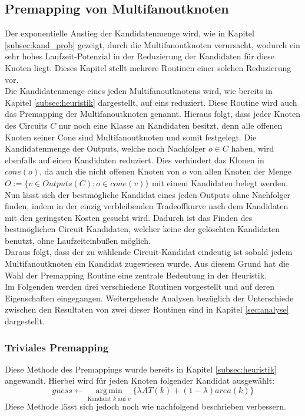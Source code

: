 \documentclass[11pt, a4paper, german]{article}
\DeclareMathOperator*{\argmin}{arg\,min}
\begin{document}
 \subsection{Premapping von Multifanoutknoten}
 \label{sec:premapping}
Der exponentielle Anstieg der Kandidatenmenge wird, wie in Kapitel \ref{subsec:kand_prob} gezeigt, durch die Multifanoutknoten verursacht, wodurch  ein sehr hohes Laufzeit-Potenzial in der Reduzierung der Kandidaten für diese Knoten liegt. Dieses Kapitel stellt mehrere Routinen einer solchen Reduzierung vor.\\

 Die Kandidatenmenge eines jeden Multifanoutknotens wird, wie bereits in Kapitel \ref{subsec:heuristik} dargestellt, auf eins reduziert. Diese Routine wird auch das Premapping der Multifanoutknoten genannt. Hieraus folgt, dass jeder Knoten des Circuits $C$ nur noch eine Klasse an Kandidaten besitzt, denn alle offenen Knoten seiner Cone sind Multifanoutknoten und somit festgelegt.  Die Kandidatenmenge der Outputs, welche noch Nachfolger $o \in C$ haben, wird ebenfalls auf einen Kandidaten reduziert. Dies verhindert das Klonen in $cone(o)$, da  auch die nicht offenen Knoten von $o$ von allen Knoten der Menge $O := \{ v \in Outputs(C): o \in cone(v) \}$ mit einem Kandidaten belegt werden.\\
Nun lässt sich der bestmögliche Kandidat eines jeden Outputs ohne Nachfolger finden, indem in der einzig verbleibenden Tradeoffkurve nach dem Kandidaten mit den geringsten Kosten gesucht wird. Dadurch ist das Finden des  bestmöglichen Circuit Kandidaten,  welcher keine der gelöschten Kandidaten benutzt, ohne Laufzeiteinbußen möglich. \\
Daraus folgt, dass der zu wählende Circuit-Kandidat eindeutig ist sobald jedem Multifanoutknoten ein Kandidat zugewiesen wurde. Aus diesem Grund hat die Wahl der Premapping Routine eine zentrale Bedeutung in der Heuristik.\\

Im Folgenden werden drei verschiedene Routinen vorgestellt und auf deren Eigenschaften eingegangen. Weitergehende Analysen bezüglich der Unterschiede zwischen den Resultaten von zwei dieser Routinen sind in Kapitel \ref{sec:analyse} dargestellt.

\subsubsection{Triviales Premapping}
\label{subsec:triviales_premapping}
Diese Methode des Premappings wurde bereits in Kapitel \ref{subsec:heuristik} angewandt. Hierbei wird für jeden Knoten folgender Kandidat ausgewählt: \[ guess \gets \argmin\limits_{\text{Kandidat }k\text{ auf }v}\{ \lambda AT(k) + (1-\lambda) area(k)  \} \]
Diese Methode lässt sich jedoch noch wie nachfolgend beschrieben verbessern.\\
\end{document}
